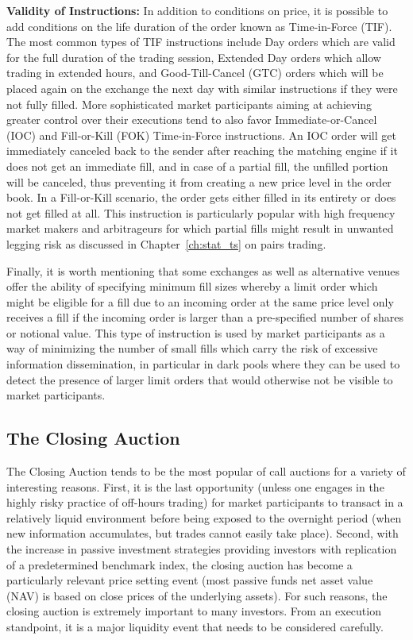 \noindent\textbf{Validity of Instructions:} In addition to conditions on price, it is possible to add conditions on the life duration of the order known as Time-in-Force (TIF). The most common types of TIF instructions include Day orders which are valid for the full duration of the trading session, Extended Day orders which allow trading in extended hours, and Good-Till-Cancel (GTC) orders which will be placed again on the exchange the next day with similar instructions if they were not fully filled. More sophisticated market participants aiming at achieving greater control over their executions tend to also favor Immediate-or-Cancel (IOC) and Fill-or-Kill (FOK) Time-in-Force instructions. An IOC order will get immediately canceled back to the sender after reaching the matching engine if it does not get an immediate fill, and in case of a partial fill, the unfilled portion will be canceled, thus preventing it from creating a new price level in the order book. In a Fill-or-Kill scenario, the order gets either filled in its entirety or does not get filled at all. This instruction is particularly popular with high frequency market makers and arbitrageurs for which partial fills might result in unwanted legging risk as discussed in Chapter~\ref{ch:stat_ts} on pairs trading.

Finally, it is worth mentioning that some exchanges as well as alternative venues offer the ability of specifying minimum fill sizes whereby a limit order which might be eligible for a fill due to an incoming order at the same price level only receives a fill if the incoming order is larger than a pre-specified number of shares or notional value. This type of instruction is used by market participants as a way of minimizing the number of small fills which carry the risk of excessive information dissemination, in particular in dark pools where they can be used to detect the presence of larger limit orders that would otherwise not be visible to market participants.  


\subsection{The Closing Auction} 
The Closing Auction tends to be the most popular of call auctions for a variety of interesting reasons. First, it is the last opportunity (unless one engages in the highly risky practice of off-hours trading) for market participants to transact in a relatively liquid environment before being exposed to the overnight period (when new information accumulates, but trades cannot easily take place). Second, with the increase in passive investment strategies providing investors with replication of a predetermined benchmark index, the closing auction has become a particularly relevant price setting event (most passive funds net asset value (NAV) is based on close prices of the underlying assets). For such reasons, the closing auction is extremely important to many investors. From an execution standpoint, it is a major liquidity event that needs to be considered carefully.


